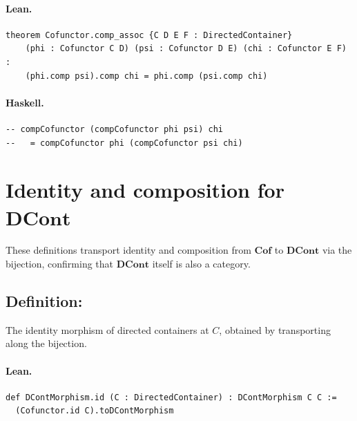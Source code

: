 \documentclass[11pt,a4paper]{article}
\begin{document}
\paragraph{Lean.}
\begin{lstlisting}[style=lean]
theorem Cofunctor.comp_assoc {C D E F : DirectedContainer}
    (phi : Cofunctor C D) (psi : Cofunctor D E) (chi : Cofunctor E F) :
    (phi.comp psi).comp chi = phi.comp (psi.comp chi)
\end{lstlisting}

\paragraph{Haskell.}
\begin{lstlisting}[style=haskell]
-- compCofunctor (compCofunctor phi psi) chi
--   = compCofunctor phi (compCofunctor psi chi)
\end{lstlisting}


\section{Identity and composition for $\mathbf{DCont}$}

These definitions transport identity and composition from $\mathbf{Cof}$ to
$\mathbf{DCont}$ via the bijection, confirming that $\mathbf{DCont}$ itself is
also a category.

\subsection{Definition: }

\begin{defn}
The identity morphism of directed containers at $C$, obtained by transporting
 along the bijection.
\end{defn}

\paragraph{Lean.}
\begin{lstlisting}[style=lean]
def DContMorphism.id (C : DirectedContainer) : DContMorphism C C :=
  (Cofunctor.id C).toDContMorphism
\end{lstlisting}
\end{document}
